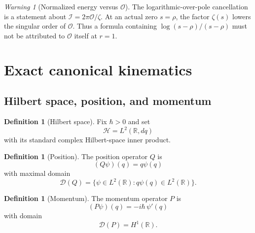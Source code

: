 \documentclass[11pt]{amsart}
\numberwithin{equation}{section}
\theoremstyle{plain}
\theoremstyle{definition}
\newtheorem{definition}[theorem]{Definition}
\theoremstyle{remark}
\newtheorem{warning}[theorem]{Warning}
\newcommand{\R}{\mathbb{R}}
\newcommand{\Hil}{\mathcal{H}}
\newcommand{\Dom}{\mathcal{D}}
\begin{document}
\begin{warning}[Normalized energy versus \(\mathcal O\)]
\label{warn:I_vs_O_notation}
The logarithmic-over-pole cancellation is a statement about
\(\mathcal I=2\pi\mathcal O/\zeta\).  At an actual zero \(s=\rho\), the
factor \(\zeta(s)\) lowers the singular order of \(\mathcal O\).  Thus a
formula containing \(\log(s-\rho)/(s-\rho)\) must not be attributed to
\(\mathcal O\) itself at \(r=1\).
\end{warning}

\section{Exact canonical kinematics}
\label{sec:kinematics}

\subsection{Hilbert space, position, and momentum}
\label{subsec:QP_definitions}

\begin{definition}[Hilbert space]
\label{def:hilbert_space}
Fix $\hbar>0$ and set
\begin{equation}
\Hil=L^2(\R,dq)
\label{eq:hilbert_space}
\end{equation}
with its standard complex Hilbert-space inner product.
\end{definition}

\begin{definition}[Position]
\label{def:position}
The position operator $Q$ is
\begin{equation}
(Q\psi)(q)=q\psi(q)
\label{eq:Q_action}
\end{equation}
with maximal domain
\begin{equation}
\Dom(Q)=\{\psi\in L^2(\R):q\psi(q)\in L^2(\R)\}.
\label{eq:Q_domain}
\end{equation}
\end{definition}

\begin{definition}[Momentum]
\label{def:momentum}
The momentum operator $P$ is
\begin{equation}
(P\psi)(q)=-i\hbar\,\psi'(q)
\label{eq:P_action}
\end{equation}
with domain
\begin{equation}
\Dom(P)=H^1(\R).
\label{eq:P_domain}
\end{equation}
\end{definition}
\end{document}
